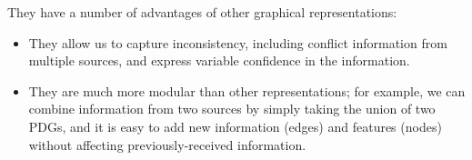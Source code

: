 \documentclass{article}
\theoremstyle{plain}
\theoremstyle{definition}
\theoremstyle{remark}
\numberwithin{equation}{section}
\begin{document}
They have a number of advantages of other
graphical representations:
\begin{itemize}
  \item They allow us to capture inconsistency,
including conflict information from multiple sources, and
express variable confidence in the information. 
\item 
They are much more
modular 
than other representations; 
for example, we can
combine information from two sources by simply taking the union of two
PDGs, and it is easy to add new information 
(edges)
and features (nodes)
without affecting previously-received information.

\end{itemize}
\end{document}
